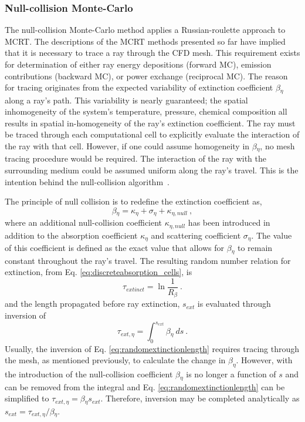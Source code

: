 \subsubsection{Null-collision Monte-Carlo}
The null-collision Monte-Carlo method applies a Russian-roulette approach to MCRT.
The descriptions of the MCRT methods presented so far have implied that it is necessary to trace a ray through the CFD mesh.
This requirement exists for determination of either ray energy depositions (forward MC), emission contributions (backward MC), or power exchange (reciprocal MC). 
The reason for tracing originates from the expected variability of extinction coefficient $\beta{}_\eta{}$ along a ray's path. 
This variability is nearly guaranteed; the spatial inhomogeneity of the system's temperature, pressure, chemical composition all results in spatial in-homogeneity of the ray's extinction coefficient. 
The ray must be traced through each computational cell to explicitly evaluate the interaction of the ray with that cell.
However, if one could assume homogeneity in $\beta{}_\eta{}$, no mesh tracing procedure would be required. The interaction of the ray with the surrounding medium could be assumed uniform along the ray's travel.
This is the intention behind the null-collision algorithm~\cite{Galtier2013IntegralAlgorithms,Eymet2013Null-collisionSimulators}.

The principle of null collision is to redefine the extinction coefficient as,
\begin{equation}
    \beta{}_\eta{} = \kappa{}_\eta{}+\sigma{}_\eta+\kappa{}_{\eta{},null}~,
    \label{eq:null_coll_absco}
\end{equation}
where an additional null-collision coefficient $\kappa{}_{\eta,null}$ has been introduced in addition to the absorption coefficient $\kappa{}_\eta$ and scattering coefficient $\sigma{}_\eta{}$. 
The value of this coefficient is defined as the exact value that allows for $\beta{}_\eta{}$ to remain constant throughout the ray's travel.
The resulting random number relation for extinction, from Eq. \ref{eq:discreteabsorption_cells}, is
\begin{equation}
    \tau_{extinct} = \ln{\frac{1}{R_\beta{}}}~.
    \label{eq:discreteabsorption_cells_repeated}
\end{equation}
and the length propagated before ray extinction, $s_{ext}$ is evaluated through inversion of
\begin{equation}
    \tau_{ext,\eta{}} = \int_0^{s_{ext}}{\beta{}_\eta{}~ds}~.
    \label{eq:randomextinctionlength}
\end{equation}
Usually, the inversion of Eq. \ref{eq:randomextinctionlength} requires tracing through the mesh, as mentioned previously, to calculate the change in $\beta_\eta$. However, with the introduction of the null-collision coefficient $\beta{}_\eta{}$ is no longer a function of $s$ and can be removed from the integral and Eq. \ref{eq:randomextinctionlength} can be simplified to $\tau{}_{ext,\eta}=\beta{}_\eta{}s_{ext}$. Therefore, inversion may be completed analytically as $s_{ext}=\tau{}_{ext,\eta}/\beta{}_\eta{}$.
 
